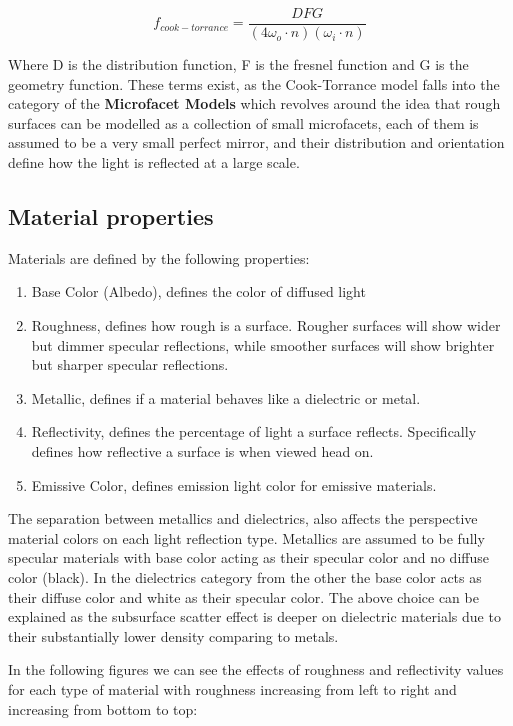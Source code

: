 $$f_{cook-torrance} = \frac{DFG}{(4 \omega_o \cdot n)(\omega_i \cdot n)}$$

Where D is the distribution function, F is the fresnel function and G is the geometry function.
These terms exist, as the Cook-Torrance model falls into the category of the \textbf{Microfacet Models} which revolves around the idea
that rough surfaces can be modelled as a collection of small microfacets, each of them is assumed to be a very small perfect mirror,
and their distribution and orientation define how the light is reflected at a large scale.

\subsection{Material properties}
Materials are defined by the following properties:

\begin{enumerate}
    \item Base Color (Albedo), defines the color of diffused light
    \item Roughness, defines how rough is a surface. Rougher surfaces will show wider but dimmer specular reflections, while smoother
        surfaces will show brighter but sharper specular reflections.
    \item Metallic, defines if a material behaves like a dielectric or metal.
    \item Reflectivity, defines the percentage of light a surface reflects. Specifically defines how reflective a surface is when viewed
        head on.
    \item Emissive Color, defines emission light color for emissive materials.
\end{enumerate}

The separation between metallics and dielectrics, also affects the perspective material colors on each light reflection type.
Metallics are assumed to be fully specular materials with base color acting as their specular color and no diffuse color (black).
In the dielectrics category from the other the base color acts as their diffuse color and white as their specular color.
The above choice can be explained as the subsurface scatter effect is deeper on dielectric materials due to their substantially
lower density comparing to metals.

In the following figures we can see the effects of roughness and reflectivity values for each type of material with
roughness increasing from left to right and increasing from bottom to top:

